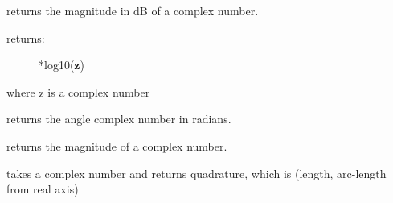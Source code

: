 \documentclass[letterpaper,10pt,english]{sphinxmanual}
\begin{document}

\begin{fulllineitems}
\label{api/mwavepy:mwavepy.mathFunctions.complex_2_db}
returns the magnitude in dB of a complex number.
\begin{description}
\item[{returns:}] *log10({\color{red}\bfseries{}\textbar{}z\textbar{}})

\end{description}

where z is a complex number

\end{fulllineitems}


\begin{fulllineitems}
\label{api/mwavepy:mwavepy.mathFunctions.complex_2_degree}
returns the angle complex number in radians.

\end{fulllineitems}


\begin{fulllineitems}
\label{api/mwavepy:mwavepy.mathFunctions.complex_2_magnitude}
returns the magnitude of a complex number.

\end{fulllineitems}


\begin{fulllineitems}
\label{api/mwavepy:mwavepy.mathFunctions.complex_2_quadrature}
takes a complex number and returns quadrature, which is (length, arc-length from real axis)

\end{fulllineitems}

\end{document}
